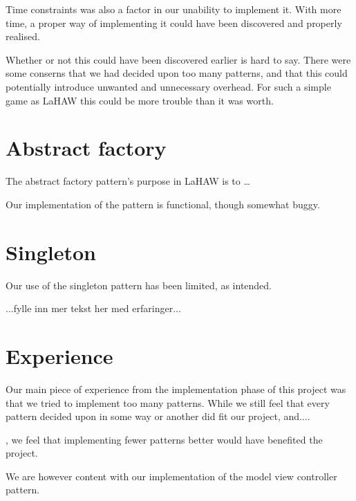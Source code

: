 Time constraints was also a factor in our unability to implement it. With more time, a proper way of implementing it could have been discovered and properly realised.

Whether or not this could have been discovered earlier is hard to say. There were some conserns that we had decided upon too many patterns, and that this could potentially introduce unwanted and unnecessary overhead. For such a simple game as LaHAW this could be more trouble than it was worth.



\section{Abstract factory}
The abstract factory pattern's purpose in LaHAW is to …


Our implementation of the pattern is functional, though somewhat buggy.


\section{Singleton}
Our use of the singleton pattern has been limited, as intended.

...fylle inn mer tekst her med erfaringer...





\section{Experience}
Our main piece of experience from the implementation phase of this project was that we tried to implement too many patterns. While we still feel that every pattern decided upon in some way or another did fit our project, and.... 

, we feel that implementing fewer patterns better would have benefited the project.

We are however content with our implementation of the model view controller pattern.







